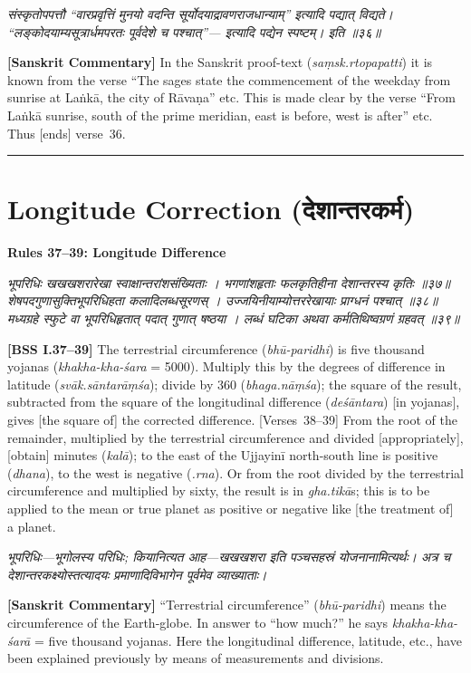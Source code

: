\documentclass[11pt,a4paper]{book}
\newcommand{\dev}[1]{{\devanagarifont #1}}
\newcommand{\shlokabilingual}[2]{%
  \par\vspace{0.8em}%
  \noindent\begin{minipage}[t]{0.48\textwidth}
    \RaggedRight
    \dev{\textit{#1}}
  \end{minipage}%
  \hfill
  \begin{minipage}[t]{0.48\textwidth}
    \RaggedRight
    #2%
  \end{minipage}%
  \par\vspace{0.8em}%
}
\newcommand{\sktcommbilingual}[2]{%
  \par\vspace{0.5em}%
  \noindent\begin{minipage}[t]{0.48\textwidth}
    \RaggedRight\small\itshape
    \dev{#1}
  \end{minipage}%
  \hfill
  \begin{minipage}[t]{0.48\textwidth}
    \RaggedRight\small
    #2%
  \end{minipage}%
  \par\vspace{0.5em}%
}
\newcommand{\ruleheadingbilingual}[2]{%
  \par\vspace{0.8em}%
  \noindent\begin{minipage}[t]{0.48\textwidth}
    \textbf{\color{sectioncolor}\dev{#1}}
  \end{minipage}%
  \hfill
  \begin{minipage}[t]{0.48\textwidth}
    \textbf{\color{sectioncolor}#2}
  \end{minipage}%
  \par\vspace{0.4em}%
}
\newcommand{\secdivider}{%
  \begin{center}\rule{0.4\textwidth}{0.5pt}\end{center}%
}
\begin{document}
\sktcommbilingual{%
संस्कृतोपपत्तौ ``वारप्रवृत्तिं मुनयो वदन्ति सूर्योदयाद्रावणराजधान्याम्‌'' इत्यादि पद्यात्‌ विद्यते। ``लङ्कोदयाम्यसूत्रार्धमपरतः पूर्वदेशे च पश्चात्‌''--- इत्यादि पद्येन स्पष्टम्‌। इति ॥३६॥
}{%
\textbf{[Sanskrit Commentary]} In the Sanskrit proof-text (\textit{saṃsk.rtopapatti}) it is known from the verse ``The sages state the commencement of the weekday from sunrise at Laṅkā, the city of Rāvaṇa'' etc. This is made clear by the verse ``From Laṅkā sunrise, south of the prime meridian, east is before, west is after'' etc. Thus [ends] verse~36.
}

\secdivider
\clearpage

\section{Longitude Correction (\dev{देशान्तरकर्म})}

\ruleheadingbilingual{नियमाः ३७--३९}{Rules 37--39: Longitude Difference}

\shlokabilingual{%
भूपरिधिः खखखशरारेखा स्वाक्षान्तरांशसंख्यिताः ।
भगणांशहृताः फलकृतिहीना देशान्तरस्य कृतिः ॥३७॥
शेषपदगुणासुक्तिभूपरिधिहता कलादिलब्धसूरणस्‌ ।
उज्जयिनीयाम्योत्तररेखायाः प्राग्धनं पश्चात्‌ ॥३८॥
मध्यग्रहे स्फुटे वा भूपरिधिहृतात्‌ पदात्‌ गुणात्‌ षष्ठया ।
लब्धं घटिका अथवा कर्मतिथिष्वग्रणं ग्रहवत्‌ ॥३९॥
}{%
\textbf{[BSS I.37--39]} The terrestrial circumference (\textit{bhū-paridhi}) is five thousand yojanas (\textit{khakha-kha-śara} = 5000). Multiply this by the degrees of difference in latitude (\textit{svāk.sāntarāṃśa}); divide by 360 (\textit{bhaga.nāṃśa}); the square of the result, subtracted from the square of the longitudinal difference (\textit{deśāntara}) [in yojanas], gives [the square of] the corrected difference. [Verses~38--39] From the root of the remainder, multiplied by the terrestrial circumference and divided [appropriately], [obtain] minutes (\textit{kalā}); to the east of the Ujjayinī north-south line is positive (\textit{dhana}), to the west is negative (\textit{.rna}). Or from the root divided by the terrestrial circumference and multiplied by sixty, the result is in \textit{gha.tikā}s; this is to be applied to the mean or true planet as positive or negative like [the treatment of] a planet.
}

\sktcommbilingual{%
\dev{भूपरिधिः}---भूगोलस्य परिधिः; कियानित्यत आह---\dev{खखखशरा} इति पञ्चसहस्रं योजनानामित्यर्थः। अत्र च देशान्तरकक्ष्योस्तत्यादयः प्रमाणादिविभागेन पूर्वमेव व्याख्याताः।
}{%
\textbf{[Sanskrit Commentary]} ``Terrestrial circumference'' (\textit{bhū-paridhi}) means the circumference of the Earth-globe. In answer to ``how much?'' he says \textit{khakha-kha-śarā} = five thousand yojanas. Here the longitudinal difference, latitude, etc., have been explained previously by means of measurements and divisions.
}
\end{document}

